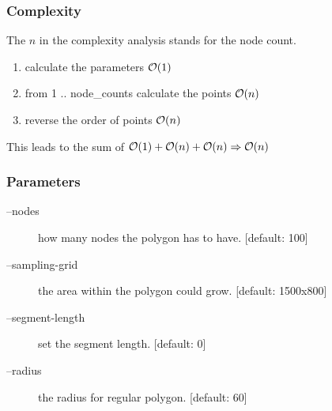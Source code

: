 \subsubsection{Complexity}
The $n$ in the complexity analysis stands for the node count.

\begin{enumerate}
  \item calculate the parameters $\mathcal{O}(1)$
  \item from 1 .. node\_counts calculate the points $\mathcal{O}(n)$
  \item reverse the order of points $\mathcal{O}(n)$
\end{enumerate}

This leads to the sum of $\mathcal{O}(1) + \mathcal{O}(n) + \mathcal{O}(n) \Rightarrow \mathcal{O}(n)$


\subsubsection{Parameters}
\begin{description}
  \item [--nodes] how many nodes the polygon has to have. [default: 100]
  \item [--sampling-grid] the area within the polygon could grow. [default: 1500x800]
  \item [--segment-length] set the segment length. [default: 0]
  \item [--radius] the radius for regular polygon. [default: 60]
\end{description}

